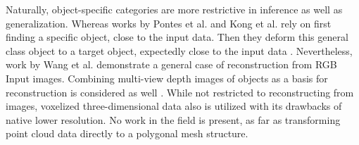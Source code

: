  Naturally, object-specific categories are more restrictive in
  inference as well as generalization. Whereas works by Pontes et al.
   and Kong et al. rely on first finding a specific object, close to
    the input data. Then they deform this general class object to a 
    target object, expectedly close to the input data \cite{cmrKanazawa18,DBLP:journals/corr/abs-1711-10669}. Nevertheless,
     work by Wang et al. \cite{wang2018pixel2mesh} demonstrate a general case of 
     reconstruction from RGB Input images.
 Combining multi-view depth images of objects as a basis for
  reconstruction is considered as well \cite{mvcTulsiani18}.
  While not restricted to reconstructing from images, 
  voxelized three-dimensional data also is utilized
   \cite{DBLP:journals/corr/abs-1804-06032} with its drawbacks of native lower resolution.
   No work in the field is present, as far as transforming point cloud data directly to a polygonal mesh structure.
   